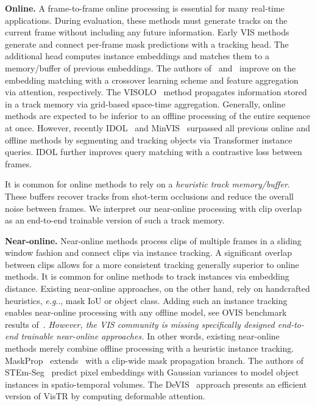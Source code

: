 \documentclass{article}
\makeatletter
\theoremstyle{plain}
\theoremstyle{definition}
\theoremstyle{remark}
\DeclareRobustCommand\onedot{\futurelet\@let@token\@onedot}
\def\@onedot{\ifx\@let@token.\else.\null\fi\xspace}
\def\eg{\emph{e.g}\onedot} \def\Eg{\emph{E.g}\onedot}
\makeatother
\begin{document}
\noindent \textbf{Online.}
A frame-to-frame online processing is essential for many real-time applications.
During evaluation, these methods must generate tracks on the current frame without including any future information.
Early VIS methods~\cite{Yang2019vis, sip_mask, sg_net} generate and connect per-frame mask predictions with a tracking head.
The additional head computes instance embeddings and matches them to a memory/buffer of previous embeddings.
The authors of~\cite{cross_vis} and~\cite{CompFeat} improve on the embedding matching with a crossover learning scheme and feature aggregation via attention, respectively.
The VISOLO~\cite{VISOLO} method propagates information stored in a track memory via grid-based space-time aggregation.
Generally, online methods are expected to be inferior to an offline processing of the entire sequence at once.
However, recently IDOL~\cite{IDOL} and MinVIS~\cite{huang2022minvis} surpassed all previous online and offline methods by segmenting and tracking objects via Transformer instance queries.
IDOL further improves query matching with a contrastive loss between frames.

It is common for online methods to rely on a \emph{heuristic track memory/buffer}.
These buffers recover tracks from shot-term occlusions and reduce the overall noise between frames.
We interpret our near-online processing with clip overlap as an end-to-end trainable version of such a track memory.


\noindent \textbf{Near-online.}
Near-online methods process clips of multiple frames in a sliding window fashion and connect clips via instance tracking.
A significant overlap between clips allows for a more consistent tracking generally superior to online methods.
It is common for online methods to track instances via embedding distance.
Existing near-online approaches, on the other hand, rely on handcrafted heuristics, \eg, mask IoU or object class.
Adding such an instance tracking enables near-online processing with any offline model, see OVIS benchmark results of~\cite{IFC,seqformer, mask2former4vis,yang2022tevit}.
\emph{However, the VIS community is missing specifically designed end-to-end trainable near-online approaches.}
In other words, existing near-online methods merely combine offline processing with a heuristic instance tracking.
MaskProp~\cite{mask_prop} extends~\cite{Yang2019vis} with a clip-wide mask propagation branch.
The authors of STEm-Seg~\cite{stem_seg} predict pixel embeddings with Gaussian variances to model object instances in spatio-temporal volumes.
The DeVIS~\cite{devis} approach presents an efficient version of VisTR by computing deformable attention. 
\end{document}
